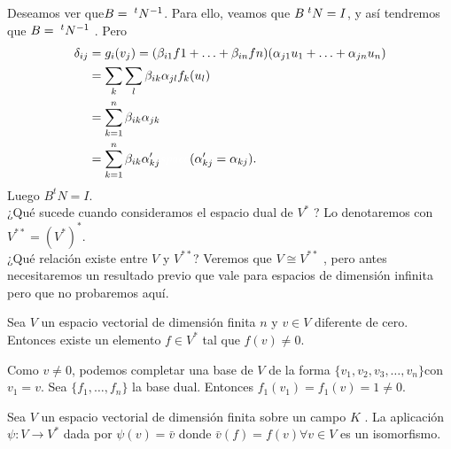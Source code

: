 		Deseamos ver que$  B = \textcolor{white}{.}^{t }N^{-1} $. Para ello, veamos que $ B\textcolor{white}{.}^{t}N = I $, y así tendremos que $ B  = \textcolor{white}{.}^{t}N^{-1} $ . Pero
		\begin{align*}
		\delta_{ij} &= g_{i}(v_{j}) = (\beta_{i1} f1 + \ldots + \beta_{in} fn)(\alpha_{j1} u_{1 }+ \ldots + \alpha_{jn} u_{n}) \\ &= \sum_{k}\sum_{l}\beta_{ik}\alpha_{jl}f_{k}(u_{l}) \\ &= \sum_{k=1}^{n}\beta_{ik}\alpha_{jk} \\ &= \sum_{k=1}^{n}\beta_{ik}\alpha'_{kj}  \textcolor{white}{space}(\alpha'_{kj} = \alpha_{kj}).
		\end{align*}
		Luego $ B^{t}N = I $. \\
		¿Qué sucede cuando consideramos el espacio dual de $ V^{*} $ ? Lo denotaremos con $ V^{**} = (V^{*})^{*} $.\\
		¿Qué  relación existe entre $ V  $ y $ V^{**}$? Veremos que $ V \cong  V^{**}$ , pero antes necesitaremos un resultado previo que vale para espacios de dimensión infinita pero que no probaremos aquí.
		\begin{lem} \label{lem2.1}
			\normalfont Sea $ V $ un espacio vectorial de dimensión finita $ n $ y $ v \in V $ diferente de cero. Entonces existe un elemento $ f \in V^{*} $ tal que $ f (v) \not = 0 $.
		\end{lem}
		\begin{demo}
			\normalfont  Como $ v \not= 0 $, podemos completar una base de $ V $ de la forma $ \{v_{1} , v_{2}, v_{3} , \ldots , v_{n} \}  $con $ v_{1} = v $. Sea $ \{f_{1} , \ldots , f_{n}\} $ la base dual. Entonces $ f_{1} (v_{1}) = f_{1} (v) = 1 \not = 0 $.
		\end{demo}
		\begin{teo} \label{teo2.3}
			\normalfont 
			Sea $ V $ un espacio vectorial de dimensión finita sobre un campo $ K $ . La aplicación $ \psi: V \longrightarrow V^{*} $ dada por $ \psi(v) = \bar{v}  $ donde $ \bar{v}(f ) =  f (v) \forall v \in V $ es un isomorfismo.
		\end{teo}
